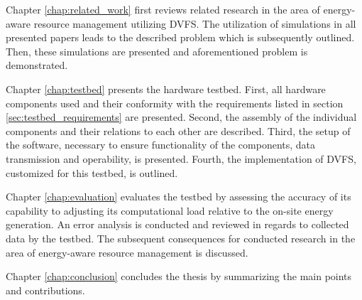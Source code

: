 Chapter \ref{chap:related_work} first reviews related research in the area of
energy-aware resource management utilizing DVFS. The utilization of simulations
in all presented papers leads to the described problem which is subsequently
outlined. Then, these simulations are presented and aforementioned problem is
demonstrated.

Chapter \ref{chap:testbed} presents the hardware testbed. First, all hardware
components used and their conformity with the requirements listed in section
\ref{sec:testbed_requirements} are presented. Second, the assembly of the
individual components and their relations to each other are described. Third,
the setup of the software, necessary to ensure functionality of the components,
data transmission and operability, is presented. Fourth, the implementation of
DVFS, customized for this testbed, is outlined.

Chapter \ref{chap:evaluation} evaluates the testbed by assessing the accuracy of
its capability to adjusting its computational load relative to the on-site
energy generation. An error analysis is conducted and reviewed in regards to
collected data by the testbed. The subsequent consequences for conducted
research in the area of energy-aware resource management is discussed.

Chapter \ref{chap:conclusion} concludes the thesis by summarizing the main
points and contributions.

